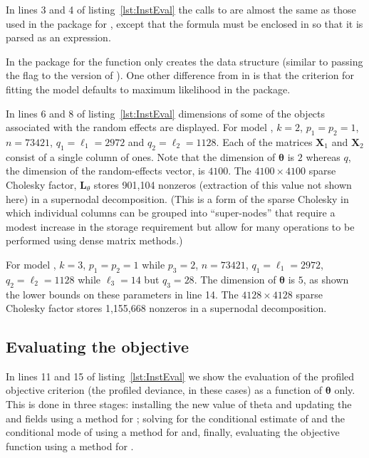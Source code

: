 \documentclass{jss}
\begin{document}
In lines 3 and 4 of listing~\ref{lst:InstEval} the calls to
 are almost the same as those used in the 
package for , except that the formula must be enclosed in
\code{:()} so that it is parsed as an expression.

In the  package for  the 
function only creates the data structure (similar to passing the
 flag to the  version of ).
One other difference from  in  is that the
criterion for fitting the model defaults to maximum likelihood in the
 package.

In lines 6 and 8 of listing~\ref{lst:InstEval} dimensions of some of
the objects associated with the random effects are displayed.  For
model , $k=2$, $p_1=p_2=1$, $n=73421$, $q_1=\ell_1=2972$ and
$q_2=\ell_2=1128$.  Each of the matrices $\bm X_1$ and $\bm X_2$
consist of a single column of ones.  Note that the dimension of
$\bm\theta$ is $2$ whereas $q$, the dimension of the random-effects
vector, is $4100$.  The $4100\times 4100$ sparse Cholesky factor, $\bm
L_\theta$ stores 901,104 nonzeros (extraction of this value not shown
here) in a supernodal decomposition.  (This is a form of the sparse
Cholesky in which individual columns can be grouped into
``super-nodes'' that require a modest increase in the storage
requirement but allow for many operations to be performed using dense
matrix methods.)

For model , $k=3$, $p_1=p_2=1$ while $p_3=2$, $n=73421$,
$q_1=\ell_1=2972$, $q_2=\ell_2=1128$ while $\ell_3=14$ but $q_3=28$.
The dimension of $\bm\theta$ is $5$, as shown the lower bounds on these
parameters in line 14.  The $4128\times 4128$ sparse Cholesky factor
stores 1,155,668 nonzeros in a supernodal decomposition.

\subsection{Evaluating the objective}
\label{sec:evaluating}

In lines 11 and 15 of listing~\ref{lst:InstEval} we show the
evaluation of the profiled objective criterion (the profiled deviance,
in these cases) as a function of $\bm\theta$ only.  This is done in
three stages: installing the new value of theta and updating the
 and  fields using a method for ;
solving for the conditional estimate of  and the
conditional mode of  using a method for  and,
finally, evaluating the objective function using a method for
.
\end{document}
